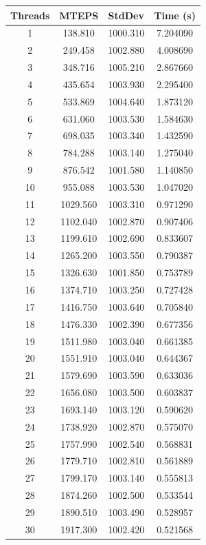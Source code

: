 \documentclass[10pt,twocolumn,letterpaper]{article}
\begin{document}
\begin{table}[h]
\renewcommand\arraystretch{0.8}
\centering
\begin{tabular}{@{}c|ccc@{}}
\toprule
Threads          & MTEPS  & StdDev     & Time (s)      \\ \midrule
1 & 138.810 & 1000.310 & 7.204090 \\
2 & 249.458 & 1002.880 & 4.008690 \\
3 & 348.716 & 1005.210 & 2.867660 \\
4 & 435.654 & 1003.930 & 2.295400 \\
5 & 533.869 & 1004.640 & 1.873120 \\
6 & 631.060 & 1003.530 & 1.584630 \\
7 & 698.035 & 1003.340 & 1.432590 \\
8 & 784.288 & 1003.140 & 1.275040 \\
9 & 876.542 & 1001.580 & 1.140850 \\
10 & 955.088 & 1003.530 & 1.047020 \\
11 & 1029.560 & 1003.310 & 0.971290 \\
12 & 1102.040 & 1002.870 & 0.907406 \\
13 & 1199.610 & 1002.690 & 0.833607 \\
14 & 1265.200 & 1003.550 & 0.790387 \\
15 & 1326.630 & 1001.850 & 0.753789 \\
16 & 1374.710 & 1003.250 & 0.727428 \\
17 & 1416.750 & 1003.640 & 0.705840 \\
18 & 1476.330 & 1002.390 & 0.677356 \\
19 & 1511.980 & 1003.040 & 0.661385 \\
20 & 1551.910 & 1003.040 & 0.644367 \\
21 & 1579.690 & 1003.590 & 0.633036 \\
22 & 1656.080 & 1003.500 & 0.603837 \\
23 & 1693.140 & 1003.120 & 0.590620 \\
24 & 1738.920 & 1002.870 & 0.575070 \\
25 & 1757.990 & 1002.540 & 0.568831 \\
26 & 1779.710 & 1002.810 & 0.561889 \\
27 & 1799.170 & 1003.140 & 0.555813 \\
28 & 1874.260 & 1002.500 & 0.533544 \\
29 & 1890.510 & 1003.490 & 0.528957 \\
30 & 1917.300 & 1002.420 & 0.521568 \\

\end{tabular}
\end{table}
\end{document}
